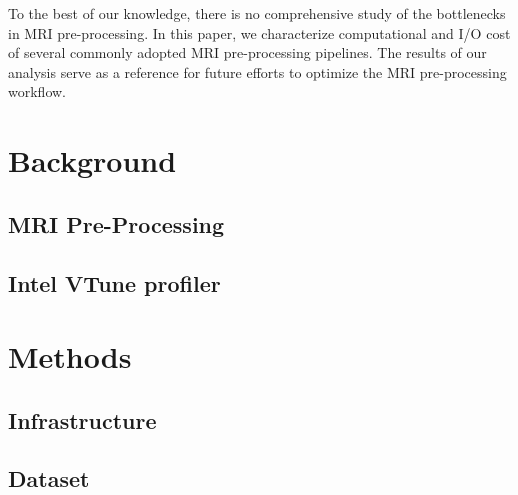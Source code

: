 \documentclass[conference]{IEEEtran}
\begin{document}
To the best of our knowledge, there is no comprehensive study of the bottlenecks in MRI pre-processing. In this paper, we characterize computational and I/O cost of several commonly adopted MRI pre-processing pipelines. The results of our analysis serve as a reference for future efforts to optimize the MRI pre-processing workflow.

\section{Background}

\subsection{MRI Pre-Processing}







\subsection{Intel VTune profiler}





\section{Methods}
\subsection{Infrastructure}

\subsection{Dataset}
\end{document}
